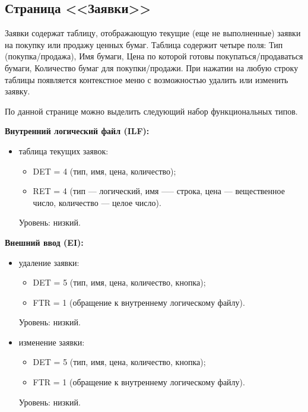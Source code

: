\documentclass{bmstu}
\begin{document}
\subsection*{Страница <<Заявки>>}


Заявки содержат таблицу, отображающую текущие (еще не выполненные) заявки на покупку или продажу ценных бумаг. Таблица содержит четыре поля: Тип (покупка/продажа), Имя бумаги, Цена по которой готовы покупаться/продаваться бумаги, Количество бумаг для покупки/продажи. При нажатии на любую строку таблицы появляется контекстное меню с возможностью удалить или изменить заявку.

По данной странице можно выделить следующий набор функциональных типов.


\textbf{Внутренний логический файл (ILF):}

\begin{itemize}
    \item таблица текущих заявок:
    \begin{itemize}
        \item DET = 4 (тип, имя, цена, количество);
        \item RET = 4 (тип --- логический, имя —-- строка, цена --- вещественное число, количество --- целое число).
    \end{itemize}
    Уровень: низкий.
\end{itemize}

\textbf{Внешний ввод (EI):}

\begin{itemize}
    \item удаление заявки:
    \begin{itemize}
        \item DET = 5 (тип, имя, цена, количество, кнопка);
        \item FTR = 1 (обращение к внутреннему логическому файлу).
    \end{itemize}
    Уровень: низкий.

    \item изменение заявки:
    \begin{itemize}
        \item DET = 5 (тип, имя, цена, количество, кнопка);
        \item FTR = 1 (обращение к внутреннему логическому файлу).
    \end{itemize}
    Уровень: низкий.
\end{itemize}
\end{document}
